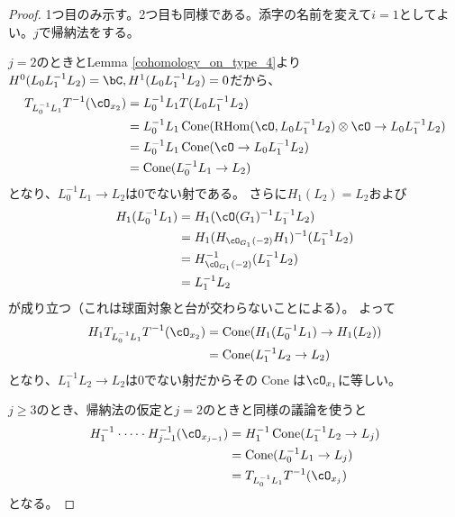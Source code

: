 \documentclass[uplatex, a4paper, dvipdfmx]{jsarticle}
\theoremstyle{definition}
\DeclareMathOperator{\Cone}{\mathrm{Cone}}
\DeclareMathOperator{\RHom}{\mathrm{RHom}}
\begin{document}
\begin{proof}
    1つ目のみ示す。2つ目も同様である。添字の名前を変えて$i=1$としてよい。$j$で帰納法をする。

    $j=2$のとき\cite[Theorem 2.2]{MR2025266}とLemma \ref{cohomology_on_type_4}より$H^0(L_0L_1^{-1}L_2) = \bC, H^1(L_0L_1^{-1}L_2) = 0$だから、
    \begin{align}
        T_{L_0^{-1}L_1}T^{-1}(\cO_{x_2}) & =L_0^{-1}L_1T(L_0L_1^{-1}L_2)                                               \\
                                         & =L_0^{-1}L_1 \Cone(\RHom(\cO, L_0L_1^{-1}L_2)\otimes\cO \to L_0L_1^{-1}L_2) \\
                                         & =L_0^{-1}L_1 \Cone(\cO \to L_0L_1^{-1}L_2)                                  \\
                                         & = \Cone(L_0^{-1}L_1 \to L_2)
    \end{align}
    となり、$L_0^{-1}L_1 \to L_2$は$0$でない射である。
    さらに$H_1(L_2) = L_2$および
    \begin{align}
        H_1(L_0^{-1}L_1) & = H_1 (\cO(G_1)^{-1}L_1^{-1}L_2)             \\
                         & =H_1(H_{\cO_{G_1}(-2)}H_1)^{-1}(L_1^{-1}L_2) \\
                         & =H_{\cO_{G_1}(-2)}^{-1}(L_1^{-1}L_2)         \\
                         & =L_1^{-1}L_2
    \end{align}
    が成り立つ（これは球面対象と台が交わらないことによる）。
    よって\begin{align}
        H_1T_{L_0^{-1}L_1}T^{-1}(\cO_{x_2}) & = \Cone(H_1(L_0^{-1}L_1) \to H_1(L_2)) \\
                                            & =\Cone(L_1^{-1}L_2 \to L_2)
    \end{align}
    となり、$L_1^{-1}L_2 \to L_2$は$0$でない射だからその$\Cone$は$\cO_{x_1}$に等しい。

    $j \geq 3$のとき、帰納法の仮定と$j=2$のときと同様の議論を使うと
    \begin{align}
        H_1^{-1}\cdot\cdots \cdot H_{j-1}^{-1}(\cO_{x_{j-1}}) & = H_1^{-1}\Cone(L_{1}^{-1}L_2 \to L_j) \\
                                                              & =\Cone(L_{0}^{-1}L_1 \to L_j)          \\
                                                              & =T_{L_0^{-1}L_1}T^{-1}(\cO_{x_j})
    \end{align}
    となる。
\end{proof}
\end{document}

